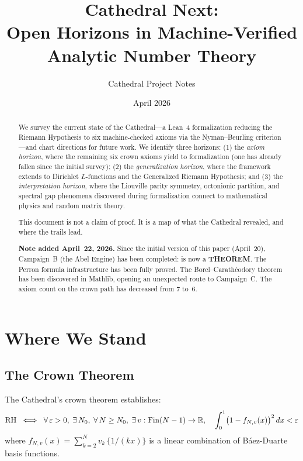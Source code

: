 \documentclass[11pt,a4paper]{article}
\title{%
  Cathedral Next:\\
  Open Horizons in Machine-Verified\\
  Analytic Number Theory%
}
\author{
  Cathedral Project Notes
}
\date{April 2026}
\begin{document}
\maketitle

\begin{abstract}
We survey the current state of the Cathedral---a Lean~4 formalization
reducing the Riemann Hypothesis to six machine-checked axioms via the
Nyman--Beurling criterion---and chart directions for future work. We
identify three horizons: (1) the \emph{axiom horizon}, where the
remaining six crown axioms yield to formalization (one has already
fallen since the initial survey); (2) the
\emph{generalization horizon}, where the framework extends to Dirichlet
$L$-functions and the Generalized Riemann Hypothesis; and (3) the
\emph{interpretation horizon}, where the Liouville parity symmetry,
octonionic partition, and spectral gap phenomena discovered during
formalization connect to mathematical physics and random matrix theory.

This document is not a claim of proof. It is a map of what the Cathedral
revealed, and where the trails lead.

\textbf{Note added April~22, 2026.} Since the initial version of this
paper (April~20), Campaign~B (the Abel Engine) has been completed:
 is now a \textbf{THEOREM}. The Perron
formula infrastructure has been fully proved. The Borel--Carath\'eodory
theorem has been discovered in Mathlib, opening an unexpected route to
Campaign~C. The axiom count on the crown path has decreased from 7 to~6.
\end{abstract}

\tableofcontents

\section{Where We Stand}
\label{sec:status}

\subsection{The Crown Theorem}

The Cathedral's crown theorem 
establishes:
\[
  \mathrm{RH} \;\iff\;
  \forall\,\varepsilon > 0,\;\exists\,N_0,\;\forall\,N \geq N_0,\;
  \exists\,v : \mathrm{Fin}(N-1) \to \mathbb{R},\quad
  \int_0^1 \bigl(1 - f_{N,v}(x)\bigr)^2\,dx < \varepsilon
\]
where $f_{N,v}(x) = \sum_{k=2}^{N} v_k\,\{1/(kx)\}$ is a linear
combination of B\'aez-Duarte basis functions.
\end{document}
